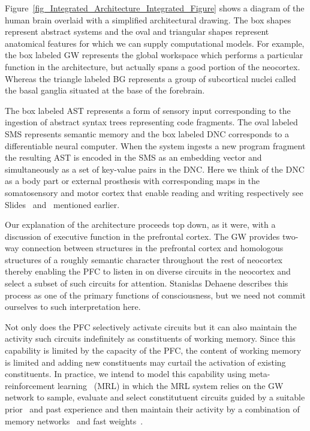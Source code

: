 
Figure~\ref{fig_Integrated_Architecture_Integrated_Figure} shows a diagram of the human brain overlaid with a simplified architectural drawing. The box shapes represent abstract systems and the oval and triangular shapes represent anatomical features for which we can supply computational models. For example, the box labeled GW represents the global workspace which performs a particular function in the architecture, but actually spans a good portion of the neocortex. Whereas the triangle labeled BG represents a group of subcortical nuclei called the basal ganglia situated at the base of the forebrain.

The box labeled AST represents a form of sensory input corresponding to the ingestion of abstract syntax trees representing code fragments. The oval labeled SMS represents semantic memory and the box labeled DNC corresponds to a differentiable neural computer. When the system ingests a new program fragment the resulting AST is encoded in the SMS as an embedding vector and simultaneously as a set of key-value pairs in the DNC. Here we think of the DNC as a body part or external prosthesis with corresponding maps in the somatosensory and motor cortex that enable reading and writing respectively \emdash{} see Slides~{{}} and~{{}} mentioned earlier.

Our explanation of the architecture proceeds top down, as it were, with a discussion of executive function in the prefrontal cortex. The GW provides two-way connection between structures in the prefrontal cortex and homologous structures of a roughly semantic character throughout the rest of neocortex thereby enabling the PFC to listen in on diverse circuits in the neocortex and select a subset of such circuits for attention. Stanislas Dehaene describes this process as one of the primary functions of consciousness, but we need not commit ourselves to such interpretation here.

Not only does the PFC selectively activate circuits but it can also maintain the activity such circuits indefinitely as constituents of working memory. Since this capability is limited by the capacity of the PFC, the content of working memory is limited and adding new constituents may curtail the activation of existing constituents. In practice, we intend to model this capability using meta-reinforcement learning~\cite{WangetalNATURE-NEUROSCIENCE-18} (MRL) in which the MRL system relies on the GW network to sample, evaluate and select constitutuent circuits guided by a suitable prior~\cite{BengioCoRR-17} and past experience and then maintain their activity by a combination of memory networks~\cite{WestonetalCoRR-14} and fast weights~\cite{BaetalCoRR-16}. 

